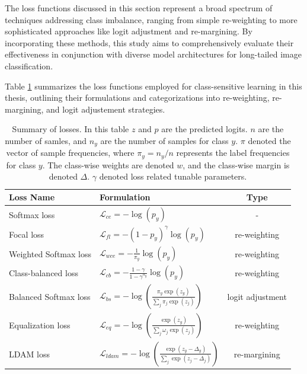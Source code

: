 \noindent The loss functions discussed in this section represent a broad spectrum of techniques addressing class imbalance, ranging from simple re-weighting to more sophisticated approaches like logit adjustment and re-margining. By incorporating these methods, this study aims to comprehensively evaluate their effectiveness in conjunction with diverse model architectures for long-tailed image classification.

Table \ref{tab:loss_summary} summarizes the loss functions employed for class-sensitive learning in this thesis, outlining their formulations and categorizations into re-weighting, re-margining, and logit adjustement strategies.


\begin{table}[H]
    \centering
    \caption{Summary of losses. In this table $z$ and $p$ are the predicted logits. $n$ are the number of samles, and $n_y$ are the number of samples for class $y$. $\pi$ denoted the vector of sample frequencies, where $\pi_y=n_y/n$ represents the label frequencies for class $y$. The class-wise weights are denoted $w$, and the class-wise margin is denoted $\Delta$. $\gamma$ denoted loss related tunable parameters.}
    \small
    \label{tab:loss_summary}
    \begin{tabular}{|l|l|c|}
    \hline
    \textbf{Loss Name}       & \textbf{Formulation}                                                & \textbf{Type}        \\ \hline
    Softmax loss \cite{pytorch_crossentropy}             & $\mathcal{L}_{ce} = - \log(p_y)$                                              & -                   \\
    Focal loss \cite{lin2018focallossdenseobject}     & $\mathcal{L}_{fl} = -(1 - p_y)^\gamma \log(p_y)$                             & re-weighting        \\
    Weighted Softmax loss \cite{zhang2023deep}    & $\mathcal{L}_{wce} = - \frac{1}{\pi_y} \log(p_y)$                           & re-weighting        \\
    Class-balanced loss \cite{cui2019classbalancedlossbasedeffective} & $\mathcal{L}_{cb} = - \frac{1 - \gamma}{1 - \gamma^{n_y}} \log(p_y)$         & re-weighting        \\
    Balanced Softmax loss \cite{ren2020balancedmetasoftmaxlongtailedvisual} & $\mathcal{L}_{bs} = - \log\left( \frac{\pi_y \exp(z_y)}{\sum_j \pi_j \exp(z_j)} \right)$ & logit adjustment        \\
    Equalization loss \cite{tan2020equalizationlosslongtailedobject} & $\mathcal{L}_{eq} = - \log\left( \frac{\exp(z_y)}{\sum_j \omega_j \exp(z_j)} \right)$    & re-weighting        \\
    LDAM loss \cite{cao2019learningimbalanceddatasetslabeldistributionaware}      & $\mathcal{L}_{ldam} = - \log\left( \frac{\exp(z_y - \Delta_y)}{\sum_j \exp(z_j - \Delta_j)} \right)$ & re-margining        \\
    \hline
    \end{tabular}
\end{table}


